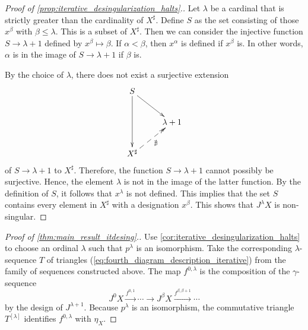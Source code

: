 \begin{proof}[Proof of \cref{prop:iterative_desingularization_halts}.]
Let $\lambda$ be a cardinal that is strictly greater than the cardinality of $X^\sharp$. Define $S$ as the set consisting of those $x^\beta$ with $\beta \leq \lambda$. This is a subset of $X^\sharp$. Then we can consider the injective function $S\to \lambda +1$ defined by $x^\beta \mapsto \beta$. If $\alpha <\beta$, then $x^\alpha$ is defined if $x^\beta$ is. In other words, $\alpha$ is in the image of $S\to \lambda +1$ if $\beta$ is.

By the choice of $\lambda$, there does not exist a surjective extension
\begin{displaymath}
\xymatrix{
S \ar[dd] \ar[dr] \\
& \lambda +1 \\
X^\sharp \ar@{-->>}[ur]_\nexists
}
\end{displaymath}
of $S\to \lambda +1$ to $X^\sharp$. Therefore, the function $S\to \lambda +1$ cannot possibly be surjective. Hence, the element $\lambda$ is not in the image of the latter function. By the definition of $S$, it follows that $x^\lambda$ is not defined. This implies that the set $S$ contains every element in $X^\sharp$ with a designation $x^\beta$. This shows that $J^\lambda X$ is non-singular.
\end{proof}
\begin{proof}[Proof of \cref{thm:main_result_itdesing}.]
Use \cref{cor:iterative_desingularization_halts} to choose an ordinal $\lambda$ such that $p^\lambda$ is an isomorphism. Take the corresponding $\lambda$-sequence $T$ of triangles (\ref{eq:fourth_diagram_description_iterative}) from the family of sequences constructed above. The map $f^{0,\lambda }$ is the composition of the $\gamma$-sequence
\[J^0X\xrightarrow{f^{0,1}} \cdots \to J^\beta X\xrightarrow{f^{\beta ,\beta +1}} \cdots\]
by the design of $J^{\lambda +1}$. Because $p^\lambda$ is an isomorphism, the commutative triangle $T^{[\lambda ]}$ identifies $f^{0,\lambda }$ with $\eta _X$.
\end{proof}



